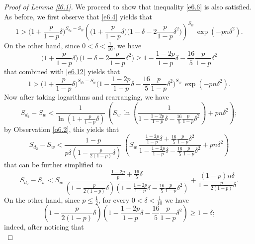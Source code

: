 \documentclass[10pt,a4paper]{amsart}
\newcommand{\meg}{\geqslant}
\newcommand{\mik}{\leqslant}
\begin{document}
\begin{proof}[Proof of Lemma \emph{\ref{l6.1}}]
We proceed to show that inequality \eqref{e6.6} is also satisfied.
As before, we first observe that \eqref{e6.4} yields that
\begin{equation} \label{e6.12}
1 > \Big(1+\frac{p}{1-p}\delta\Big)^{S_{d_2}-S_w}
\left(\big(1+\frac{p}{1-p}\delta\big)\big(1-\delta-2\frac{p}{1-p}\delta^2\big)\right)^{S_w}\, \exp(-pn\delta^2).
\end{equation}
On the other hand, since $0<\delta<\frac{1}{10}$, we have
\begin{equation} \label{e6.13}
\Big(1+\frac{p}{1-p}\delta\Big)\, \Big(1-\delta-2\frac{p}{1-p}\delta^2\Big)\meg
1-\frac{1-2p}{1-p}\delta-\frac{16}{5}\frac{p}{1-p}\delta^2
\end{equation}
that combined with \eqref{e6.12} yields that
\begin{equation} \label{e6.14}
1 > \Big(1+\frac{p}{1-p}\delta\Big)^{S_{d_2}-S_w}
\Big(1-\frac{1-2p}{1-p}\delta-\frac{16}{5}\frac{p}{1-p}\delta^2\Big)^{S_w}\, \exp(-pn\delta^2).
\end{equation}
Now after taking logarithms and rearranging, we have
\begin{equation} \label{e6.15}
S_{d_2}-S_w < \frac{1}{\ln\left(1+\frac{p}{1-p}\delta\right)} \,
\left(S_w\, \ln\left(\frac{1}{1-\frac{1-2p}{1-p}\delta-\frac{16}{5}\frac{p}{1-p}\delta^2}\right)+pn\delta^2\right);
\end{equation}
by Observation \ref{o6.2}, this yields that
\begin{equation} \label{e6.16}
S_{d_2}-S_w < \frac{1-p}{p\delta\left(1-\frac{p}{2(1-p)}\delta\right)} \,
\left(S_w\, \frac{\frac{1-2p}{1-p}\delta+\frac{16}{5}
\frac{p}{1-p}\delta^2}{1-\frac{1-2p}{1-p}\delta-\frac{16}{5}\frac{p}{1-p}\delta^2} + pn\delta^2\right)
\end{equation}
that can be further simplified to
\begin{equation} \label{e6.17}
S_{d_2}-S_w <  S_w\, \frac{\frac{1-2p}{p}+\frac{16}{5}\delta}{\left(1-\frac{p}{2(1-p)}\delta\right)
\left(1-\frac{1-2p}{1-p}\delta-\frac{16}{5}\frac{p}{1-p}\delta^2\right)}+
\frac{(1-p)n\delta}{1-\frac{p}{2(1-p)}\delta}.
\end{equation}
On the other hand, since $p\mik \frac12$, for every $0<\delta<\frac{1}{10}$ we have
\begin{equation} \label{e6.18}
\left(1-\frac{p}{2(1-p)}\delta\right)
\left(1-\frac{1-2p}{1-p}\delta-\frac{16}{5}\frac{p}{1-p}\delta^2\right)\meg 1-\delta;
\end{equation}
indeed, after noticing that
\begin{equation} \label{en.6.2}

\end{equation}
\end{proof}
\end{document}
